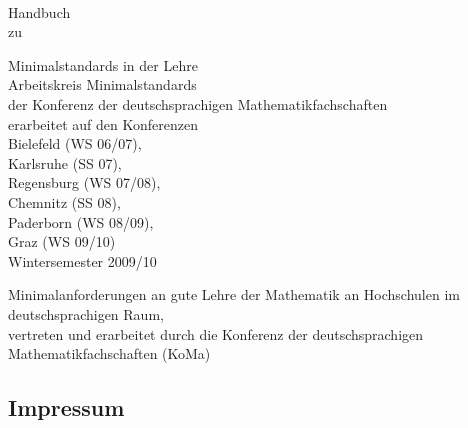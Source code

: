 \documentclass[10pt,twoside,a5paper,openright]{book}
\begin{document}
\frontmatter
{}
\newpage
\thispagestyle{empty}~
\newpage


\begin{titlepage}
\begin{flushright}\sffamily
	\vspace*{1cm}
	{\Huge{Handbuch}}\\
	\vspace{2.0cm}
	{\large zu}\bigskip\par
	{\huge{Minimalstandards in der Lehre}} \\
	\vspace{2ex}
	\vfill
	{\large{Arbeitskreis Minimalstandards}\smallskip \\ 
	{\large{der Konferenz der deutschsprachigen Mathematikfachschaften}}\\
	\vspace{1cm}
	erarbeitet auf den Konferenzen}\smallskip\\	
	{\small
	Bielefeld (WS 06/07), \\
	Karlsruhe (SS 07),  \\
	Regensburg (WS 07/08), \\
	Chemnitz (SS 08), \\
	Paderborn (WS 08/09),\\
	Graz (WS 09/10)
	}\\
	\vspace{3cm}
	{\Large Wintersemester 2009/10}\\
	\vspace{14ex}
\end{flushright}
\end{titlepage}


\newpage
\vspace*{5cm}

\begin{center}
	Minimalanforderungen an gute Lehre der Mathematik
	an Hochschulen im deutschsprachigen Raum,\\
	vertreten und erarbeitet durch die Konferenz der deutschsprachigen Mathematikfachschaften (KoMa)
\end{center}

\vfill
\subsection*{Impressum}
\end{document}
